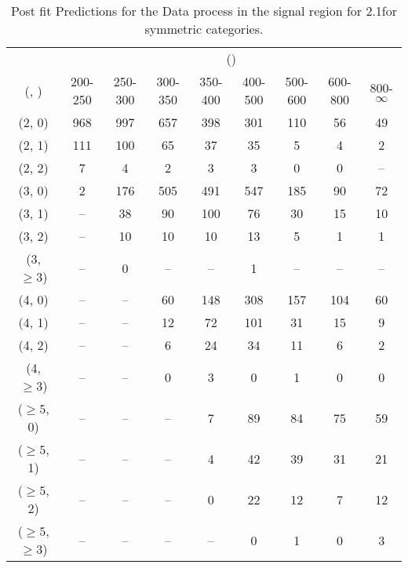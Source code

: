 \begin{table}[h!]
\tiny
\centering
\caption{Post fit Predictions for the Data process in the signal region for 2.1\ifb for symmetric categories.\label{tab:predseppost_sig_data_sym}}
\begin{tabular}
{ccccccccc}
	\hline\hline
	& \multicolumn{8}{c}{\scalht (\gev)} \\ 
	 (\njet,  \nb) & 200-250 & 250-300 & 300-350 & 350-400 & 400-500 & 500-600 & 600-800 & 800-$\infty$ \\ [0.8ex] 
\hline
	(2, 0) & 968 & 997 & 657 & 398 & 301 & 110 & 56 & 49 \\[0.5ex] 
	(2, 1) & 111 & 100 & 65 & 37 & 35 & 5 & 4 & 2 \\[0.5ex] 
	(2, 2) & 7 & 4 & 2 & 3 & 3 & 0 & 0 & -- \\[0.5ex] 
	(3, 0) & 2 & 176 & 505 & 491 & 547 & 185 & 90 & 72 \\[0.5ex] 
	(3, 1) & -- & 38 & 90 & 100 & 76 & 30 & 15 & 10 \\[0.5ex] 
	(3, 2) & -- & 10 & 10 & 10 & 13 & 5 & 1 & 1 \\[0.5ex] 
	(3, $\ge3$) & -- & 0 & -- & -- & 1 & -- & -- & -- \\[0.5ex] 
	(4, 0) & -- & -- & 60 & 148 & 308 & 157 & 104 & 60 \\[0.5ex] 
	(4, 1) & -- & -- & 12 & 72 & 101 & 31 & 15 & 9 \\[0.5ex] 
	(4, 2) & -- & -- & 6 & 24 & 34 & 11 & 6 & 2 \\[0.5ex] 
	(4, $\ge3$) & -- & -- & 0 & 3 & 0 & 1 & 0 & 0 \\[0.5ex] 
	($\ge5$, 0) & -- & -- & -- & 7 & 89 & 84 & 75 & 59 \\[0.5ex] 
	($\ge5$, 1) & -- & -- & -- & 4 & 42 & 39 & 31 & 21 \\[0.5ex] 
	($\ge5$, 2) & -- & -- & -- & 0 & 22 & 12 & 7 & 12 \\[0.5ex] 
	($\ge5$, $\ge3$) & -- & -- & -- & -- & 0 & 1 & 0 & 3 \\[0.5ex] 
	\hline
	\hline
\end{tabular}
\end{table}
